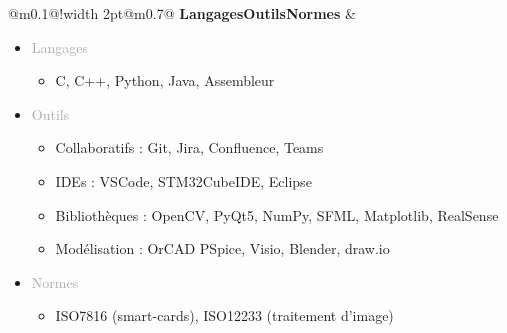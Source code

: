 \documentclass{article}
\begin{document}
\begin{tabular}{@{\hspace{0.05\textwidth}}m{}@{\hspace{0.05\textwidth}}!{\color{secondaryBlue}\vline width 2pt}@{}m{0.7\textwidth}@{}}
    \textcolor{secondaryBlue}{\textbf{Langages\newline Outils\newline Normes}} & 
    \begin{itemize}[label={}, topsep=0pt, partopsep=0pt, itemsep=0.5pt, parsep=2pt] 

        \item \textcolor{darkGray}{Langages}
        \begin{itemize}[label={\textcolor{gray!80}{\checkmark}}, topsep=0pt, partopsep=0pt, itemsep=0.5pt, parsep=2pt] 
            \item \textcolor{gray!80}{C, C++, Python, Java, Assembleur}
        \end{itemize}

        \item \textcolor{darkGray}{Outils}
        \begin{itemize}[label={\textcolor{gray!80}{\checkmark}}, topsep=0pt, partopsep=0pt, itemsep=0.5pt, parsep=2pt]
            \item \textcolor{gray!80}{Collaboratifs : Git, Jira, Confluence, Teams}
            \item \textcolor{gray!80}{IDEs : VSCode, STM32CubeIDE, Eclipse}
            \item \textcolor{gray!80}{Bibliothèques : OpenCV, PyQt5, NumPy, SFML, Matplotlib, RealSense}
            \item \textcolor{gray!80}{Modélisation : OrCAD PSpice, Visio, Blender, draw.io}
        \end{itemize}

        \item \textcolor{darkGray}{Normes}
        \begin{itemize}[label={\textcolor{gray!80}{\checkmark}}, topsep=0pt, partopsep=0pt, itemsep=0.5pt, parsep=2pt, after=\vspace*{-\baselineskip}] 
            \item \textcolor{gray!80}{ISO7816 (smart-cards), ISO12233 (traitement d'image)}
        \end{itemize}
    \end{itemize}
\end{tabular}


\end{document}
